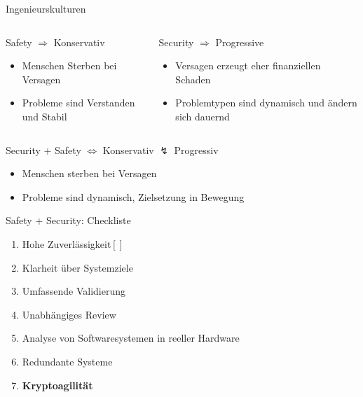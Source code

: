 \begin{frame}[T]{Ingenieurskulturen}
	\begin{columns}[t,fullwidth]
		\hfill
		\begin{column}{.45\linewidth}
			\begin{block}{Safety $\Longrightarrow$ Konservativ}
				\begin{itemize}
				\item Menschen Sterben bei Versagen
				\item Probleme sind Verstanden und Stabil
				\end{itemize}
			\end{block}
		\end{column}
		\begin{column}{.45\linewidth}
			\begin{block}{Security $\Longrightarrow$ Progressive}
				\begin{itemize}
				\item Versagen erzeugt eher finanziellen Schaden
				\item Problemtypen sind dynamisch und ändern sich dauernd
				\end{itemize}
			\end{block}
		\end{column}
		\hfill
	\end{columns}

    \begin{block}{Security + Safety $\Longleftrightarrow$ Konservativ $\lightning$ Progressiv}
	    \begin{itemize}
	      \item Menschen sterben bei Versagen
	      \item Probleme sind dynamisch, Zielsetzung in Bewegung
	    \end{itemize}
  	\end{block}
\end{frame}

\begin{frame}[T]{Safety + Security: Checkliste}
  \begin{enumerate}
    \item Hohe Zuverlässigkeit\hfill $[ ]$
    \item Klarheit über Systemziele
    \item Umfassende Validierung
	\item Unabhängiges Review
    \item Analyse von Softwaresystemen in reeller Hardware
    \item Redundante Systeme
    \item \textbf{Kryptoagilität}
  \end{enumerate}
\end{frame}
